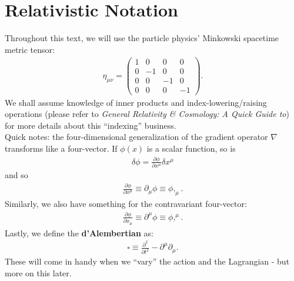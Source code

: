 \documentclass{book}
\numberwithin{equation}{section}
\theoremstyle{definition}
\newcommand{\p}{\partial}
\begin{document}
\section{Relativistic Notation}
Throughout this text, we will use the particle physics' Minkowski spacetime metric tensor:
\begin{align}
\eta_{\mu\nu} = \begin{pmatrix}
1&0&0&0\\
0&-1&0&0\\
0&0&-1&0\\
0&0&0&-1
\end{pmatrix}.
\end{align}
We shall assume knowledge of inner products and index-lowering/raising operations (please refer to \textit{General Relativity \& Cosmology: A Quick Guide to}) for more details about this ``indexing'' business. \\

Quick notes: the four-dimensional generalization of the gradient operator $\nabla$ transforms like a four-vector. If $\phi(x)$ is a scalar function, so is
\begin{align}
\delta \phi = \frac{\p \phi}{\p x^\mu}\delta x^\mu
\end{align}
and so
\begin{align}
\frac{\p \phi}{\p x^\mu} \equiv \p_\mu \phi \equiv \phi,_\mu.
\end{align}
Similarly, we also have something for the contravariant four-vector:
\begin{align}
\frac{\p \phi}{\p x_\mu} \equiv \p^\mu \phi \equiv \phi,^\mu.
\end{align}
Lastly, we define the \textbf{d'Alembertian} as:
\begin{align}
\square \equiv \frac{\p^2}{\p t^2} - \p^\mu \p_\mu.
\end{align}
These will come in handy when we ``vary'' the action and the Lagrangian - but more on this later. 
\end{document}
